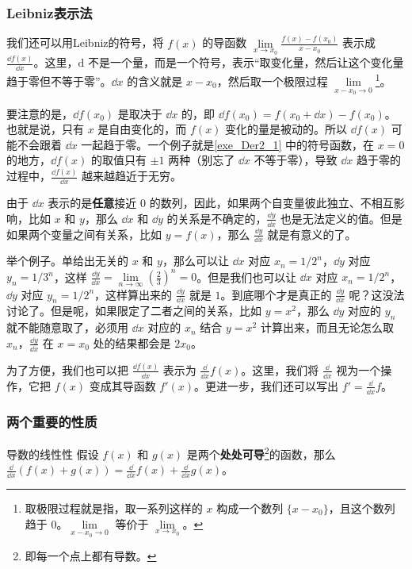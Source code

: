 \subsubsection{Leibniz表示法}


我们还可以用Leibniz的符号，将 $f(x)$ 的导函数 $\lim\limits_{x\to x_0}\frac{f(x)-f(x_0)}{x-x_0}$ 表示成 $\frac{\dd f(x)}{\dd x}$。这里，$\mathrm{d}$ 不是一个量，而是一个符号，表示“取变化量，然后让这个变化量趋于零但不等于零”。$\dd x$ 的含义就是 $x-x_0$，然后取一个极限过程 $\lim\limits_{x-x_0\to 0}$\footnote{取极限过程就是指，取一系列这样的 $x$ 构成一个数列 $\{x-x_0\}$，且这个数列趋于 $0$。$\lim\limits_{x-x_0\to 0}$ 等价于 $\lim\limits_{x\to x_0}$。}。

要注意的是，$\dd f(x_0)$ 是取决于 $\dd x$ 的，即 $\dd f(x_0)=f(x_0+\dd x)-f(x_0)$。也就是说，只有 $x$ 是自由变化的，而 $f(x)$ 变化的量是被动的。所以 $\dd f(x)$ 可能不会跟着 $\dd x$ 一起趋于零。一个例子就是\autoref{exe_Der2_1} 中的符号函数，在 $x=0$ 的地方，$\dd f(x)$ 的取值只有 $\pm 1$ 两种（别忘了 $\dd x$ 不等于零），导致 $\dd x$ 趋于零的过程中，$\frac{\dd f(x)}{\dd x}$ 越来越趋近于无穷。


由于 $\dd x$ 表示的是\textbf{任意}接近 $0$ 的数列，因此，如果两个自变量彼此独立、不相互影响，比如 $x$ 和 $y$，那么 $\dd x$ 和 $\dd y$ 的关系是不确定的，$\frac{\dd y}{\dd x}$ 也是无法定义的值。但是如果两个变量之间有关系，比如 $y=f(x)$，那么 $\frac{\dd y}{\dd x}$ 就是有意义的了。

举个例子。单给出无关的 $x$ 和 $y$，那么可以让 $\dd x$ 对应 $x_n=1/2^n$，$\dd y$ 对应 $y_n=1/3^n$，这样 $\frac{\dd y}{\dd x}=\lim\limits_{n\to\infty}(\frac{2}{3})^n=0$。但是我们也可以让 $\dd x$ 对应 $x_n=1/2^n$，$\dd y$ 对应 $y_n=1/2^n$，这样算出来的 $\frac{\dd y}{\dd x}$ 就是 $1$。到底哪个才是真正的 $\frac{\dd y}{\dd x}$ 呢？这没法讨论了。但是呢，如果限定了二者之间的关系，比如 $y=x^2$，那么 $\dd y$ 对应的 $y_n$ 就不能随意取了，必须用 $\dd x$ 对应的 $x_n$ 结合 $y=x^2$ 计算出来，而且无论怎么取 $x_n$，$\frac{\dd y}{\dd x}$ 在 $x=x_0$ 处的结果都会是 $2x_0$。

为了方便，我们也可以把 $\frac{\dd f(x)}{\dd x}$ 表示为 $\frac{\dd}{\dd x}f(x)$。这里，我们将 $\frac{\dd}{\dd x}$ 视为一个操作，它把 $f(x)$ 变成其导函数 $f'(x)$。更进一步，我们还可以写出 $f'=\frac{\dd}{\dd x}f$。


\subsubsection{两个重要的性质}

\begin{theorem}{导数的线性性}\label{the_Der2_2}
假设 $f(x)$ 和 $g(x)$ 是两个\textbf{处处可导}\footnote{即每一个点上都有导数。}的函数，那么 $\frac{\dd}{\dd x}(f(x)+g(x))=\frac{\dd}{\dd x}f(x)+\frac{\dd}{\dd x}g(x)$。
\end{theorem}

